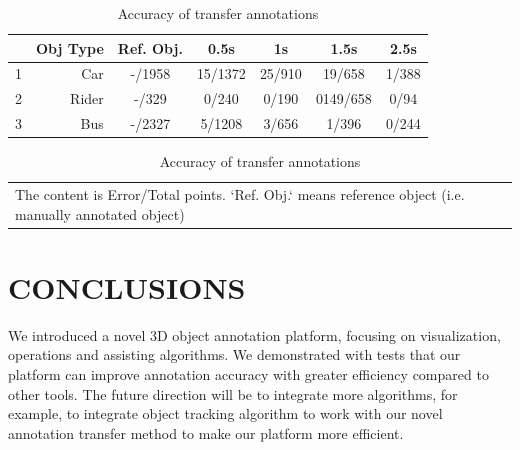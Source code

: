 \documentclass[letterpaper, 10 pt, conference]{ieeeconf}  %
\begin{document}
\begin{table}[h]
	\centering
	\caption{Accuracy of transfer annotations}
	\label{tab:transfer-evaluation}
	\begin{tabular}{|c|r|c|c|c|c|c|}
		\hline
		 & \textbf{Obj Type} & \textbf{Ref. Obj.}&\textbf{0.5s} & \textbf{1s} & \textbf{1.5s}& \textbf{2.5s} \\
		\hline
		\hline
		 1 & Car &-/1958& 15/1372 & 25/910 & 19/658 &  1/388\\
		\hline
  		 2 & Rider &-/329& 0/240 & 0/190 & 0149/658 &  0/94\\
		\hline
  		 3 & Bus &-/2327& 5/1208 & 3/656 & 1/396 &  0/244\\
\hline
	\end{tabular}

\begin{tabular}{p{\linewidth}}
	The content is Error/Total points. `Ref. Obj.` means reference object (i.e. manually annotated object)
\end{tabular}


\end{table}


\section{CONCLUSIONS}
\label{sec:conclusions}

We introduced a novel 3D object annotation platform, focusing on visualization, operations and assisting algorithms. We demonstrated with tests that our platform can improve annotation accuracy with greater efficiency compared to other tools. The future direction will be to integrate more algorithms, for example, to integrate object tracking algorithm to work with our novel annotation transfer method to make our platform more efficient.



\addtolength{\textheight}{-12cm}   %

\end{document}
